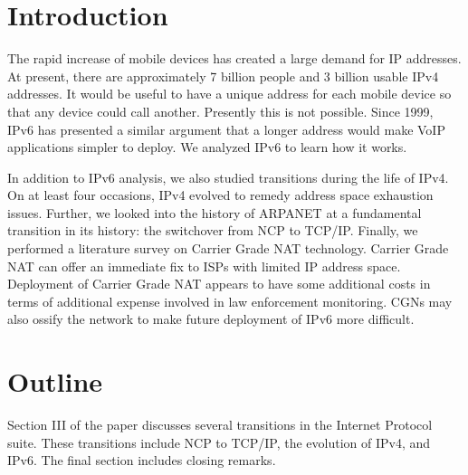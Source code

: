 \documentclass[letterpaper,10pt]{IEEEtranTCOM}
\begin{document}
\section{Introduction}

The rapid increase of mobile devices has created a large demand for
IP addresses.  At present, there are approximately 7 billion people and 3 billion usable IPv4 addresses.
It would be useful to have a unique address for each mobile device so that any device could call another.  
Presently this is not possible.  Since 1999, IPv6 has presented a similar
argument that a longer address would make VoIP applications simpler to deploy.  We analyzed IPv6 to learn
how it works.

In addition to IPv6 analysis, we also studied transitions during the life of IPv4.  On at least four occasions, IPv4
evolved to remedy address space exhaustion issues.  Further, we looked into the history of ARPANET
at a fundamental transition in its history: the switchover from NCP to TCP/IP.  Finally, we
performed a literature survey on Carrier Grade NAT technology.  Carrier Grade NAT can offer an immediate fix
to ISPs with limited IP address space.  Deployment of Carrier Grade NAT appears to have some additional costs in terms
of additional expense involved in law enforcement monitoring.  CGNs may also ossify the network to make future deployment
of IPv6 more difficult.

\section{Outline}
Section III of the paper discusses several transitions in the Internet Protocol
suite.  These transitions include NCP to TCP/IP, the evolution of IPv4, and IPv6.
The final section includes closing remarks.


%




\end{document}
